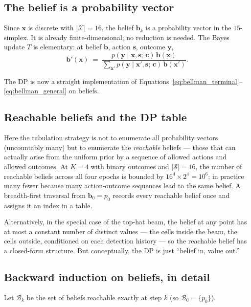 \documentclass[11pt]{article}
\newcommand{\bc}{\bm{c}}
\newcommand{\bx}{\bm{x}}
\newcommand{\by}{\bm{y}}
\newcommand{\bs}{\bm{s}}
\newcommand{\bb}{\bm{b}}
\begin{document}
\subsection{The belief is a probability vector}

Since $\bx$ is discrete with $|\mathcal{X}| = 16$, the belief $\bb_k$ is a probability vector in the $15$-simplex.  It is already finite-dimensional; no reduction is needed.  The Bayes update $T$ is elementary: at belief $\bb$, action $\bs$, outcome $\by$,
\begin{equation}
\bb'(\bx) \;=\; \frac{p(\by \mid \bx, \bs;\, \bc)\, \bb(\bx)}{\sum_{\bx'} p(\by \mid \bx', \bs;\, \bc)\, \bb(\bx')}.
\label{eq:radar_bayes}
\end{equation}

The DP is now a straight implementation of Equations~\eqref{eq:bellman_terminal}--\eqref{eq:bellman_general} on beliefs.

\subsection{Reachable beliefs and the DP table}

Here the tabulation strategy is not to enumerate all probability vectors (uncountably many) but to enumerate the \emph{reachable} beliefs --- those that can actually arise from the uniform prior by a sequence of allowed actions and allowed outcomes.  At $K = 4$ with binary outcomes and $|\mathcal{S}| = 16$, the number of reachable beliefs across all four epochs is bounded by $16^4 \times 2^4 = 10^6$; in practice many fewer because many action-outcome sequences lead to the same belief.  A breadth-first traversal from $\bb_0 = p_0$ records every reachable belief once and assigns it an index in a table.

Alternatively, in the special case of the top-hat beam, the belief at any point has at most a constant number of distinct values --- the cells inside the beam, the cells outside, conditioned on each detection history --- so the reachable belief has a closed-form structure.  But conceptually, the DP is just ``belief in, value out.''

\subsection{Backward induction on beliefs, in detail}

Let $\mathcal{B}_k$ be the set of beliefs reachable exactly at step $k$ (so $\mathcal{B}_0 = \{p_0\}$).
\end{document}

